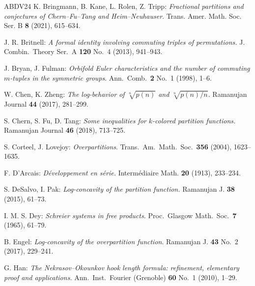 \documentclass[11pt,reqno]{amsart}
\theoremstyle{plain}
\theoremstyle{remark}
\theoremstyle{definition}
\numberwithin{equation}{section}
\begin{document}
\begin{thebibliography}{ABDV24}
  K. Bringmann, B. Kane, L. Rolen, Z. Tripp:
\emph{Fractional partitions and conjectures of Chern--Fu--Tang and Heim--Neuhauser\/}. Trans. Amer. Math. Soc. Ser. B
\textbf{8}
(2021), 615--634.


  J. R. Britnell: \emph{A formal identity involving commuting triples of permutations.\/} J. Combin.\ Theory Ser.\ A \textbf{120} No.\ 4 (2013), 941--943.



 J. Bryan,
J. Fulman: 
\emph{Orbifold Euler characteristics and the number of commuting 
$m$-tuples in the symmetric groups\/}.
Ann.\ Comb.\ \textbf{2} No.\ 1 (1998), 1--6.


 W. Chen, K. Zheng: 
\emph{The log-behavior of $\sqrt[n]{p(n)}$ and $\sqrt[n]{p(n)/n}$.}
Ramanujan Journal
\textbf{44} (2017), 281--299. 


 S. Chern, S. Fu, D. Tang: \emph{Some inequalities for $k$-colored partition functions.}
Ramanujan Journal
\textbf{46} (2018), 713--725. 

 S. Corteel, J. Lovejoy:
\emph{Overpartitions\/}. Trans.\ Am.\ Math.\ Soc.\ \textbf{356}
(2004), 1623--1635.


 


 F. D'Arcais: 
\emph{D\'{e}veloppement en s\'{e}rie.\/} Interm\'{e}diaire Math. 
\textbf{20} (1913), 233--234.

 S. DeSalvo, I. Pak:
\emph{Log-concavity of the partition function.\/}
Ramanujan J.
\textbf{38} (2015), 61--73. 

 I. M. S. Dey: \emph{Schreier systems in free products.\/}
Proc.\ Glasgow Math.\ Soc.\ \textbf{7} (1965), 61--79.

  B. Engel:
\emph{Log-concavity of the overpartition
function\/}.
Ramanujan J. \textbf{43}
No.\ 2
(2017), 229--241.


 G. Han: 
\emph{The Nekrasov--Okounkov hook length formula: refinement, elementary proof and applications.\/}
Ann.\ Inst.\ Fourier (Grenoble)
\textbf{60}
No.~1 (2010), 1--29.


\end{thebibliography}
\end{document}
